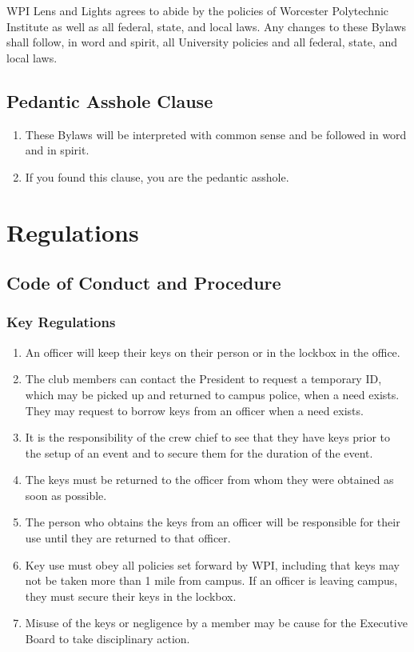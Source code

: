 \documentclass[12pt,letterpaper]{book}
\begin{document}
WPI Lens and Lights agrees to abide by the policies of Worcester Polytechnic Institute as well as all federal, state, and local laws. Any changes to these Bylaws shall follow, in word and spirit, all University policies and all federal, state, and local laws.

\chapter{Pedantic Asshole Clause}

\begin{enumerate}

\item These Bylaws will be interpreted with common sense and be followed in word and in spirit.
\item If you found this clause, you are the pedantic asshole.

\end{enumerate}

\part{Regulations}

\renewcommand{\chaptername}{Chapter}

\chapter{Code of Conduct and Procedure}

\section{Key Regulations}

\begin{enumerate}

\item An officer will keep their keys on their person or in the lockbox in the office.
\item The club members can contact the President to request a temporary ID, which may be picked up and returned to campus police, when a need exists. They may request to borrow keys from an officer when a need exists.
\item It is the responsibility of the crew chief to see that they have keys prior to the setup of an event and to secure them for the duration of the event.
\item The keys must be returned to the officer from whom they were obtained as soon as possible.
\item The person who obtains the keys from an officer will be responsible for their use until they are returned to that officer.
\item Key use must obey all policies set forward by WPI, including that keys may not be taken more than 1 mile from campus. If an officer is leaving campus, they must secure their keys in the lockbox.
\item Misuse of the keys or negligence by a member may be cause for the Executive Board to take disciplinary action.

\end{enumerate}
\end{document}
